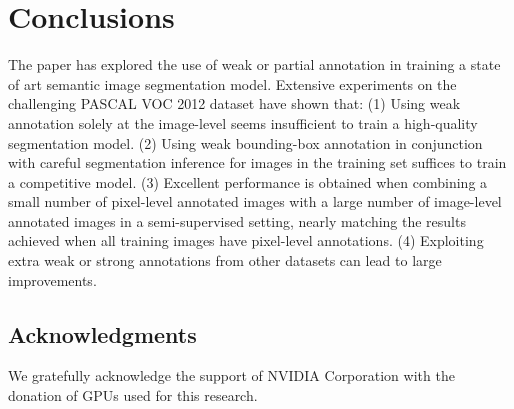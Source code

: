 \section{Conclusions}

The paper has explored the use of weak or partial annotation
in training a state of art semantic image segmentation
model. Extensive experiments on the challenging PASCAL VOC 2012
dataset have shown that: (1) Using weak annotation solely at the
image-level seems insufficient to train a high-quality segmentation
model. (2) Using weak bounding-box annotation in conjunction with
careful segmentation inference for images in the training set suffices
to train a competitive model. (3) Excellent performance is obtained when
combining a small number of pixel-level annotated images with a large
number of image-level annotated images in a semi-supervised setting,
nearly matching the results achieved when all training images have
pixel-level annotations. (4) Exploiting extra weak or strong
annotations from other datasets can lead to large improvements.

\subsection*{Acknowledgments} 

We gratefully acknowledge the support of NVIDIA Corporation with the donation
of GPUs used for this research.

